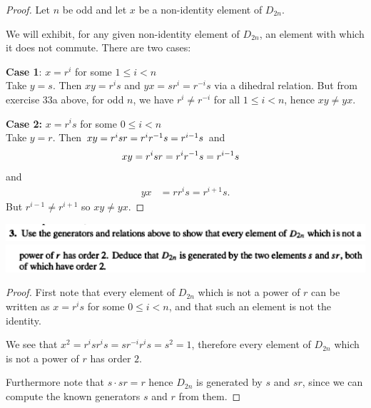 \begin{proof}
  Let $n$ be odd and let $x$ be a non-identity element of $D_{2n}$.

  We will exhibit, for any given non-identity element of $D_{2n}$, an element with which it does
  not commute. There are two cases:

  {\bf Case 1}:  $x = r^i$ for some $1 \leq i < n$ \\
  Take $y = s$. Then $xy = r^is$ and $yx = sr^i = r^{-i}s$ via a dihedral relation. But from
  exercise 33a above, for odd $n$, we have $r^i \neq r^{-i}$ for all $1 \leq i < n$, hence $xy \neq yx$.


  {\bf Case 2:}  $x = r^is$ for some $0 \leq i < n$ \\
  Take $y = r$. Then $xy = r^isr = r^ir^{-1}s = r^{i - 1}s$ and
  \begin{align*}
    xy &= r^isr = r^ir^{-1}s = r^{i - 1}s
  \end{align*}
  and
  \begin{align*}
    yx &= rr^is = r^{i+1}s.
  \end{align*}
  But $r^{i-1} \neq r^{i+1}$ so $xy \neq yx$.
\end{proof}



\newpage
\begin{mdframed}
\includegraphics[width=400pt]{img/algebra--nf--2-9bae.png}\\
\includegraphics[width=400pt]{img/algebra--nf--2-e89d.png}
\end{mdframed}

\begin{proof}
  First note that every element of $D_{2n}$ which is not a power of $r$ can be written
  as $x = r^is$ for some $0 \leq i < n$, and that such an element is not the identity.

  We see that $x^2 = r^isr^is = sr^{-i}r^is = s^2 = 1$, therefore every element of $D_{2n}$ which is
  not a power of $r$ has order $2$.

  Furthermore note that $s\cdot sr = r$ hence $D_{2n}$ is generated by $s$ and $sr$, since we can
  compute the known generators $s$ and $r$ from them.
\end{proof}


